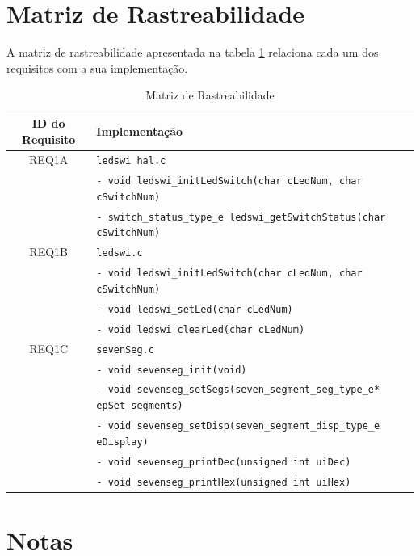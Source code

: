 \documentclass{article}
\begin{document}
\section{Matriz de Rastreabilidade}
A matriz de rastreabilidade apresentada na tabela \ref*{tab:rastreabilidade} relaciona cada um dos requisitos com a sua implementação.
\begin{table}[H]
	\centering
	\caption{Matriz de Rastreabilidade}
	\label{tab:rastreabilidade}
	\small
	\begin{tabular}{|c|l|}
		\hline \bfseries{ID do Requisito} & \bfseries{Implementação}\\ 
		\hline REQ1A 	& \texttt{ledswi\_hal.c}\\ 
						& \texttt{- void ledswi\_initLedSwitch(char cLedNum, char cSwitchNum)}\\
						& \texttt{- switch\_status\_type\_e ledswi\_getSwitchStatus(char cSwitchNum)}\\
		\hline REQ1B 	& \texttt{ledswi.c}\\ 
						& \texttt{- void ledswi\_initLedSwitch(char cLedNum, char cSwitchNum)}\\
						& \texttt{- void ledswi\_setLed(char cLedNum)}\\ 
						& \texttt{- void ledswi\_clearLed(char cLedNum)}\\
		\hline REQ1C 	& \texttt{sevenSeg.c}\\ 
						& \texttt{- void sevenseg\_init(void)}\\
						& \texttt{- void sevenseg\_setSegs(seven\_segment\_seg\_type\_e* epSet\_segments)}\\
						& \texttt{- void sevenseg\_setDisp(seven\_segment\_disp\_type\_e eDisplay)}\\
						& \texttt{- void sevenseg\_printDec(unsigned int uiDec)}\\
						& \texttt{- void sevenseg\_printHex(unsigned int uiHex)}\\
		\hline 
	\end{tabular} 
	\normalsize
\end{table}
\section{Notas}
\end{document}
